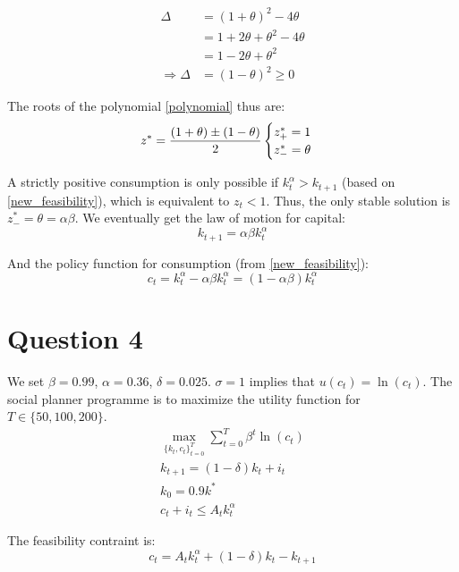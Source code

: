 \documentclass[a4paper,12pt]{article}
\begin{document}
\begin{align}
    \Delta & = (1 + \theta)^2 - 4\theta \\
    & = 1 + 2\theta + \theta^2 - 4\theta \\
    & = 1 - 2\theta + \theta^2 \\
    \Rightarrow \Delta & = (1 - \theta)^2 \geq 0
\end{align}

The roots of the polynomial \eqref{polynomial} thus are:
\begin{equation}
    z^* = \frac{(1 + \theta) \pm (1 - \theta)}{2} \\
    \begin{cases}
        z^*_+ = 1 \\
        z^*_- = \theta
    \end{cases}
\end{equation}

A strictly positive consumption is only possible if $k^\alpha_t > k_{t+1}$ (based on \eqref{new_feasibility}), 
which is equivalent to $z_t < 1$. Thus, the only stable solution is $z^*_- = \theta = \alpha \beta$.
We eventually get the law of motion for capital:
\begin{equation}
    k_{t+1} = \alpha \beta k_t^\alpha
\end{equation}

And the policy function for consumption (from \eqref{new_feasibility}):
\begin{equation}
    c_t = k_t^\alpha - \alpha \beta k_t^\alpha = (1 - \alpha \beta) k_t^\alpha
\end{equation}

\section{Question 4}

We set $\beta = 0.99$, $\alpha = 0.36$, $\delta = 0.025$. $\sigma = 1$
implies that $u(c_t) = \ln(c_t)$. 
The social planner programme is to maximize the utility function for 
$T \in \{50, 100, 200\}$. 
\begin{align*}
    \max_{\{k_t, c_t\}^T_{t=0}} \sum_{t = 0}^T \beta^t \ln(c_t) \\
    k_{t+1} = (1 - \delta) k_t + i_t \\
    k_0 = 0.9 k^* \\
    c_t + i_t \leq A_t k_t^\alpha
\end{align*}

The feasibility contraint is: 
\begin{equation} \label{other_constraint}
    c_t = A_t k_t^\alpha + (1 - \delta) k_t - k_{t+1}
\end{equation}
\end{document}
